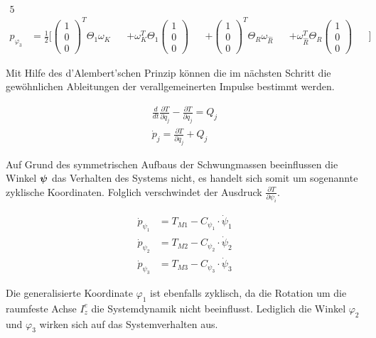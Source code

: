 \begin{alignat}{5}
\\
p_{\varphi_3} &= \frac{1}{2} \Bigg[ \begin{pmatrix}1\\0\\0\end{pmatrix}^T\Theta_1\omega_K &&+ \omega^T_K \Theta_1 \begin{pmatrix}1\\0\\0\end{pmatrix} &&+ \begin{pmatrix}1\\0\\0\end{pmatrix}^T \Theta_R \omega_{\widehat{R}} &&+ \omega^T_{\widehat{R}} \Theta_R \begin{pmatrix}1\\0\\0\end{pmatrix} &&\Bigg]
\end{alignat}

Mit Hilfe des d'Alembert'schen Prinzip können die im nächsten Schritt die gewöhnlichen Ableitungen der verallgemeinerten Impulse bestimmt werden.

\begin{equation}
\begin{split}
\frac{d}{d t} \frac{\partial T}{\partial \dot{q}_j} - \frac{\partial T}{\partial q_j} = Q_j 
\\
\dot{p}_j = \frac{\partial T}{\partial q_j} + Q_j
\end{split}
\end{equation}

Auf Grund des symmetrischen Aufbaus der Schwungmassen beeinflussen die Winkel $\boldsymbol{\psi}$ das Verhalten des Systems nicht, es handelt sich somit um sogenannte zyklische Koordinaten. Folglich verschwindet der Ausdruck $\frac{\partial T}{\partial \psi_i}$.

\begin{align}
\dot{p}_{\psi_1} &= T_{M1} - C_{\psi_1} \cdot \dot{\psi}_1 \\
\dot{p}_{\psi_2} &= T_{M2} - C_{\psi_2} \cdot \dot{\psi}_2 \\
\dot{p}_{\psi_3} &= T_{M3} - C_{\psi_3} \cdot \dot{\psi}_3 
\end{align}

Die generalisierte Koordinate $\varphi_1$ ist ebenfalls zyklisch, da die Rotation um die raumfeste Achse $I^e_z$ die Systemdynamik nicht beeinflusst. Lediglich die Winkel $\varphi_2$ und $\varphi_3$ wirken sich auf das Systemverhalten aus.

